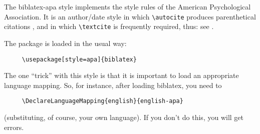 
\usepackage[style=british]{csquotes}
\usepackage[style=apa,backend=biber]{biblatex}
\renewcommand{\showingstyle}{APA}

%
The \textsf{biblatex-apa} style implements the style rules of the American Psychological Association. It is an author/date style in which \verb~\autocite~ produces parenthetical citations \autocite{worman, reese}, and in which \verb~\textcite~ is frequently required, thus: see \textcite{worman}.

The package is loaded in the usual way:
\begin{verbatim}
     \usepackage[style=apa]{biblatex}
\end{verbatim}
The one \enquote{trick} with this style is that it is important to load an appropriate language mapping. So, for instance, after loading \textsf{biblatex}, you need to
\begin{verbatim}
     \DeclareLanguageMapping{english}{english-apa}
\end{verbatim}
(substituting, of course, your own language). If you don't do this, you will get errors.





